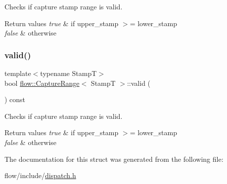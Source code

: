 Checks if capture stamp range is valid. 


\begin{DoxyRetVals}{Return values}
{\em true} & if upper\+\_\+stamp $>$= lower\+\_\+stamp \\
\hline
{\em false} & otherwise \\
\hline
\end{DoxyRetVals}
\mbox{\label{structflow_1_1_capture_range_accdfed5d9a2410aed2a5e242b7d1335b}} 
\subsubsection{\texorpdfstring{valid()}{valid()}}
{\footnotesize\ttfamily template$<$typename StampT$>$ \\
bool \hyperlink{structflow_1_1_capture_range}{flow\+::\+Capture\+Range}$<$ StampT $>$\+::valid (\begin{DoxyParamCaption}{ }\end{DoxyParamCaption}) const\hspace{0.3cm}{\ttfamily [inline]}}



Checks if capture stamp range is valid. 


\begin{DoxyRetVals}{Return values}
{\em true} & if upper\+\_\+stamp $>$= lower\+\_\+stamp \\
\hline
{\em false} & otherwise \\
\hline
\end{DoxyRetVals}


The documentation for this struct was generated from the following file\+:\begin{DoxyCompactItemize}
\item 
flow/include/\hyperlink{dispatch_8h}{dispatch.\+h}\end{DoxyCompactItemize}
